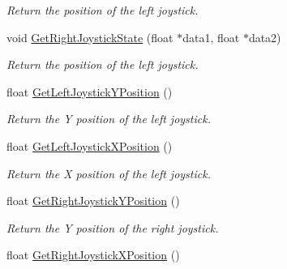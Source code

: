 \begin{DoxyCompactItemize}
\begin{DoxyCompactList}\small\item\em Return the position of the left joystick. \item\end{DoxyCompactList}\item 
\hypertarget{classvtkVSP_a093602da6356d7a2d83d4b1e0c820969}{
void \hyperlink{classvtkVSP_a093602da6356d7a2d83d4b1e0c820969}{GetRightJoystickState} (float $\ast$data1, float $\ast$data2)}
\label{classvtkVSP_a093602da6356d7a2d83d4b1e0c820969}

\begin{DoxyCompactList}\small\item\em Return the position of the left joystick. \item\end{DoxyCompactList}\item 
\hypertarget{classvtkVSP_ac672ef2c63798003b5b802eb2995c7db}{
float \hyperlink{classvtkVSP_ac672ef2c63798003b5b802eb2995c7db}{GetLeftJoystickYPosition} ()}
\label{classvtkVSP_ac672ef2c63798003b5b802eb2995c7db}

\begin{DoxyCompactList}\small\item\em Return the Y position of the left joystick. \item\end{DoxyCompactList}\item 
\hypertarget{classvtkVSP_abc5c4b774170f69a1e653a830eaa850e}{
float \hyperlink{classvtkVSP_abc5c4b774170f69a1e653a830eaa850e}{GetLeftJoystickXPosition} ()}
\label{classvtkVSP_abc5c4b774170f69a1e653a830eaa850e}

\begin{DoxyCompactList}\small\item\em Return the X position of the left joystick. \item\end{DoxyCompactList}\item 
\hypertarget{classvtkVSP_af0900941205cbf30865951fed08c90d8}{
float \hyperlink{classvtkVSP_af0900941205cbf30865951fed08c90d8}{GetRightJoystickYPosition} ()}
\label{classvtkVSP_af0900941205cbf30865951fed08c90d8}

\begin{DoxyCompactList}\small\item\em Return the Y position of the right joystick. \item\end{DoxyCompactList}\item 
\hypertarget{classvtkVSP_ab338cddba4dd2a4f12a5859d0475da26}{
float \hyperlink{classvtkVSP_ab338cddba4dd2a4f12a5859d0475da26}{GetRightJoystickXPosition} ()}
\label{classvtkVSP_ab338cddba4dd2a4f12a5859d0475da26}


\end{DoxyCompactItemize}
